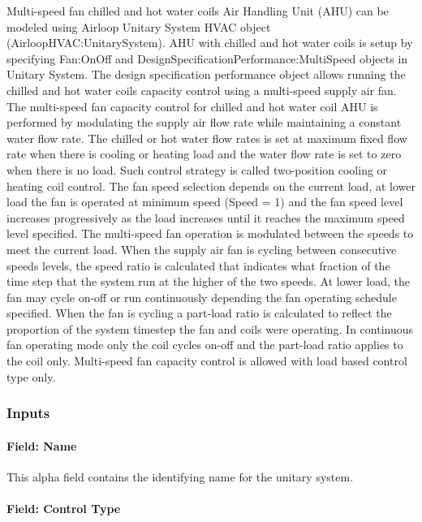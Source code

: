 Multi-speed fan chilled and hot water coils Air Handling Unit (AHU) can be modeled using Airloop Unitary System HVAC object (AirloopHVAC:UnitarySystem). AHU with chilled and hot water coils is setup by specifying Fan:OnOff and DesignSpecificationPerformance:MultiSpeed objects in Unitary System. The design specification performance object allows running the chilled and hot water coils capacity control using a multi-speed supply air fan. The multi-speed fan capacity control for chilled and hot water coil AHU is performed by modulating the supply air flow rate while maintaining a constant water flow rate. The chilled or hot water flow rates is set at maximum fixed flow rate when there is cooling or heating load and the water flow rate is set to zero when there is no load. Such control strategy is called two-position cooling or heating coil control. The fan speed selection depends on the current load, at lower load the fan is operated at minimum speed (Speed = 1) and the fan speed level increases progressively as the load increases until it reaches the maximum speed level specified. The multi-speed fan operation is modulated between the speeds to meet the current load. When the supply air fan is cycling between consecutive speeds levels, the speed ratio is calculated that indicates what fraction of the time step that the system run at the higher of the two speeds. At lower load, the fan may cycle on-off or run continuously depending the fan operating schedule specified. When the fan is cycling a part-load ratio is calculated to reflect the proportion of the system timestep the fan and coils were operating. In continuous fan operating mode only the coil cycles on-off and the part-load ratio applies to the coil only. Multi-speed fan capacity control is allowed with load based control type only.

\subsubsection{Inputs}\label{inputs-049}

\paragraph{Field: Name}\label{field-name-048}

This alpha field contains the identifying name for the unitary system.

\paragraph{Field: Control Type}\label{field-control-type-004}

